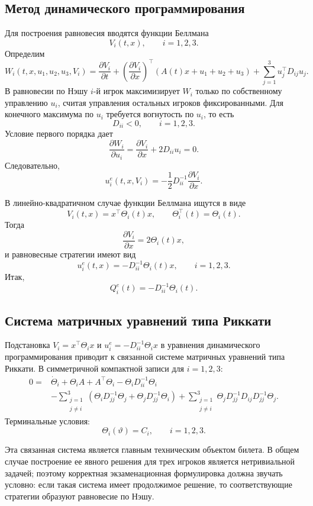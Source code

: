 \documentclass[12pt,a4paper]{article}
\begin{document}
\subsection*{Метод динамического программирования}
Для построения равновесия вводятся функции Беллмана
\[
V_i(t,x),\qquad i=1,2,3.
\]
Определим
\[
W_i(t,x,u_1,u_2,u_3,V_i)=
\frac{\partial V_i}{\partial t}+
\left(\frac{\partial V_i}{\partial x}\right)^{\top}(A(t)x+u_1+u_2+u_3)+
\sum_{j=1}^3u_j^{\top} D_{ij}u_j .
\]
В равновесии по Нэшу \(i\)-й игрок максимизирует \(W_i\) только по собственному управлению \(u_i\), считая управления остальных игроков фиксированными. Для конечного максимума по \(u_i\) требуется вогнутость по \(u_i\), то есть
\[
D_{ii}<0,
\qquad i=1,2,3.
\]
Условие первого порядка дает
\[
\frac{\partial W_i}{\partial u_i}=\frac{\partial V_i}{\partial x}+2D_{ii}u_i=0.
\]
Следовательно,
\[
u_i^e(t,x,V_i)=-\frac12D_{ii}^{-1}\frac{\partial V_i}{\partial x}.
\]

В линейно-квадратичном случае функции Беллмана ищутся в виде
\[
V_i(t,x)=x^{\top}\Theta_i(t)x,
\qquad \Theta_i^{\top}(t)=\Theta_i(t).
\]
Тогда
\[
\frac{\partial V_i}{\partial x}=2\Theta_i(t)x,
\]
и равновесные стратегии имеют вид
\[
u_i^e(t,x)=-D_{ii}^{-1}\Theta_i(t)x,
\qquad i=1,2,3.
\]
Итак,
\[
Q_i^e(t)=-D_{ii}^{-1}\Theta_i(t).
\]

\subsection*{Система матричных уравнений типа Риккати}
Подстановка \(V_i=x^{\top}\Theta_i x\) и \(u_i^e=-D_{ii}^{-1}\Theta_i x\) в уравнения динамического программирования приводит к связанной системе матричных уравнений типа Риккати. В симметричной компактной записи для \(i=1,2,3\):
\[
\begin{aligned}
0={}&\dot\Theta_i+\Theta_iA+A^{\top}\Theta_i-\Theta_iD_{ii}^{-1}\Theta_i \\
&-\sum_{\substack{j=1\\ j\ne i}}^3
\left(\Theta_iD_{jj}^{-1}\Theta_j+\Theta_jD_{jj}^{-1}\Theta_i\right)
+\sum_{\substack{j=1\\ j\ne i}}^3
\Theta_jD_{jj}^{-1}D_{ij}D_{jj}^{-1}\Theta_j .
\end{aligned}
\]
Терминальные условия:
\[
\Theta_i(\vartheta)=C_i,\qquad i=1,2,3.
\]

Эта связанная система является главным техническим объектом билета. В общем случае построение ее явного решения для трех игроков является нетривиальной задачей; поэтому корректная экзаменационная формулировка должна звучать условно: если такая система имеет продолжимое решение, то соответствующие стратегии образуют равновесие по Нэшу.
\end{document}
